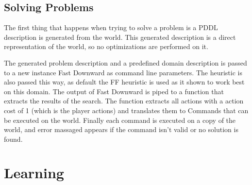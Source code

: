 	\subsection{Solving Problems}
	The first thing that happens when trying to solve a problem is a PDDL description is generated from the world. This generated description is a direct representation of the world, so no optimizations are performed on it.

	The generated problem description and a predefined domain description is passed to a new instance Fast Downward as command line parameters. The heuristic is also passed this way, as default the FF heuristic is used as it shown to work best on this domain. The output of Fast Downward is piped to a function that extracts the results of the search. The function extracts all actions with a action cost of 1 (which is the player actions) and translates them to Commands that can be executed on the world. Finally each command is executed on a copy of the world, and error massaged appears if the command isn't valid or no solution is found. 
	
\section{Learning}